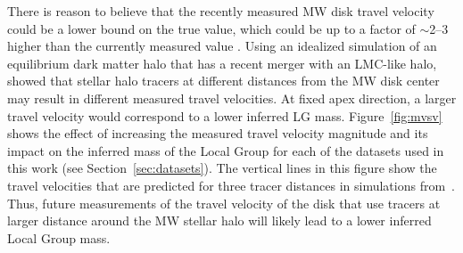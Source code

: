 \documentclass[twocolumn]{aastex631}
\newcommand{\kc}[1]{\textcolor{pink}{\textbf{#1}} }
\newcommand{\mlg}{\ensuremath{M_{\rm LG}}}
\begin{document}


There is reason to believe that the recently measured MW disk travel velocity
could be a lower bound on the true value, which could be up to a factor of
$\sim$2--3 higher than the currently measured value
\cite{Garavito-Camargo2021b}.
Using an idealized simulation of an equilibrium dark matter halo that has a
recent merger with an LMC-like halo, \cite{Garavito-Camargo2021b} showed that
stellar halo tracers at different distances from the MW disk center may result
in different measured travel velocities.
At fixed apex direction, a larger travel velocity would correspond to a lower
inferred LG mass.
Figure~\ref{fig:mvsv} shows the effect of increasing the measured travel
velocity magnitude and its impact on the inferred mass of the Local Group for
each of the datasets used in this work (see Section~\ref{sec:datasets}).
The vertical lines in this figure show the travel velocities that are predicted
for three tracer distances in simulations from~\cite{Garavito-Camargo2021b}.
Thus, future measurements of the travel velocity of the disk that use tracers at
larger distance around the MW stellar halo will likely lead to a lower inferred
Local Group mass.




\end{document}
